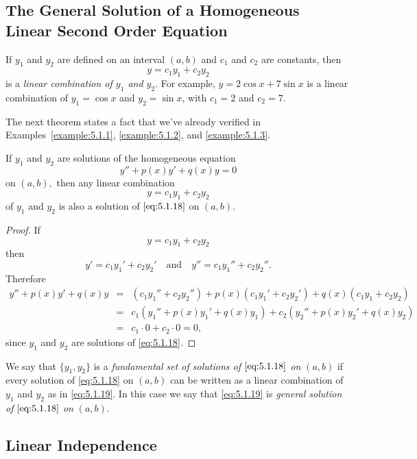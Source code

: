 \documentclass{ximera}
\begin{document}
\subsection*{The General Solution of a Homogeneous Linear Second Order
Equation}

If $y_1$ and $y_2$ are defined on an interval
$(a,b)$ and $c_1$ and $c_2$ are constants, then
$$
y=c_1y_1+c_2y_2
$$
is a \textit{linear combination of $y_1$ and $y_2$}. For
example, $y=2\cos x+7 \sin x$ is a linear combination of $y_1=
\cos x$ and $y_2=\sin x$, with $c_1=2$ and $c_2=7$.

The next theorem states a fact that we've already verified in
Examples~\ref{example:5.1.1}, \ref{example:5.1.2}, and \ref{example:5.1.3}.

\begin{theorem}\label{thmtype:5.1.2}
If $y_1$ and $y_2$ are solutions of the homogeneous equation
\begin{equation}\label{eq:5.1.18}
y''+p(x)y'+q(x)y=0
\end{equation}
on $(a,b),$ then any linear combination
\begin{equation}\label{eq:5.1.19}
y=c_1y_1+c_2y_2
\end{equation}
of $y_1$ and $y_2$ is also a solution of $\eqref{eq:5.1.18}$ on $(a,b).$
\end{theorem}

\begin{proof}
 If
$$
y=c_1y_1+c_2y_2
$$
 then
$$
y'=c_1y_1'+c_2y_2'\quad\mbox{and}\quad y''=c_1y_1''+c_2y_2''.
$$
Therefore
\begin{eqnarray*}
y''+p(x)y'+q(x)y&=&(c_1y_1''+c_2y_2'')+p(x)(c_1y_1'+c_2y_2')
+q(x)(c_1y_1+c_2y_2)\\
&=&c_1\left(y_1''+p(x)y_1'+q(x)y_1\right)
+c_2\left(y_2''+p(x)y_2'+q(x)y_2\right)\\
&=&c_1\cdot0+c_2\cdot0=0,
\end{eqnarray*}
since $y_1$ and $y_2$ are solutions of \eqref{eq:5.1.18}.  
\end{proof}
We say that  $\{y_1,y_2\}$ is a \textit{fundamental set of
solutions of $\eqref{eq:5.1.18}$ on}  $(a,b)$ if every solution
of \eqref{eq:5.1.18} on  $(a,b)$ can be written as a linear
combination of $y_1$ and $y_2$ as in \eqref{eq:5.1.19}.
In this case we say that \eqref{eq:5.1.19} is
\textit{general solution of $\eqref{eq:5.1.18}$ on}  $(a,b)$.

\subsection*{Linear Independence}
\end{document}
